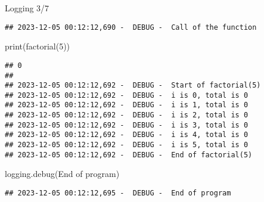 \documentclass[
  8pt,
  ignorenonframetext,
]{beamer}
\newenvironment{Shaded}{\begin{snugshade}}{\end{snugshade}}
\newcommand{\BuiltInTok}[1]{#1}
\newcommand{\DecValTok}[1]{\textcolor[rgb]{0.00,0.00,0.81}{#1}}
\newcommand{\NormalTok}[1]{#1}
\newcommand{\StringTok}[1]{\textcolor[rgb]{0.31,0.60,0.02}{#1}}
\begin{document}
\begin{frame}[fragile]{Logging 3/7}
\begin{verbatim}
## 2023-12-05 00:12:12,690 -  DEBUG -  Call of the function
\end{verbatim}

\begin{Shaded}
\begin{Highlighting}[]
\BuiltInTok{print}\NormalTok{(factorial(}\DecValTok{5}\NormalTok{))}
\end{Highlighting}
\end{Shaded}

\begin{verbatim}
## 0
## 
## 2023-12-05 00:12:12,692 -  DEBUG -  Start of factorial(5)
## 2023-12-05 00:12:12,692 -  DEBUG -  i is 0, total is 0
## 2023-12-05 00:12:12,692 -  DEBUG -  i is 1, total is 0
## 2023-12-05 00:12:12,692 -  DEBUG -  i is 2, total is 0
## 2023-12-05 00:12:12,692 -  DEBUG -  i is 3, total is 0
## 2023-12-05 00:12:12,692 -  DEBUG -  i is 4, total is 0
## 2023-12-05 00:12:12,692 -  DEBUG -  i is 5, total is 0
## 2023-12-05 00:12:12,692 -  DEBUG -  End of factorial(5)
\end{verbatim}

\begin{Shaded}
\begin{Highlighting}[]
\NormalTok{logging.debug(}\StringTok{\textquotesingle{}End of program\textquotesingle{}}\NormalTok{)}
\end{Highlighting}
\end{Shaded}

\begin{verbatim}
## 2023-12-05 00:12:12,695 -  DEBUG -  End of program
\end{verbatim}
\end{frame}
\end{document}
